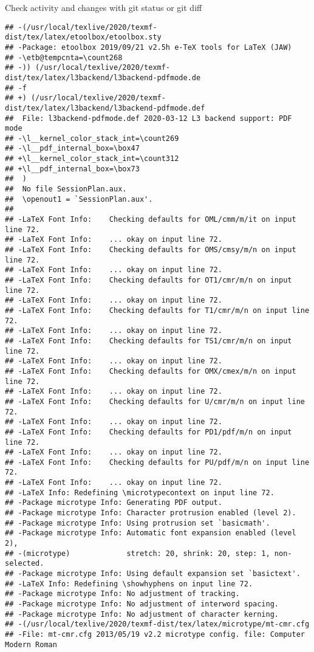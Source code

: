 \documentclass[ignorenonframetext,]{beamer}
\begin{document}
\begin{frame}[fragile]{Check activity and changes with git status or git
diff}
\begin{verbatim}
## -(/usr/local/texlive/2020/texmf-dist/tex/latex/etoolbox/etoolbox.sty
## -Package: etoolbox 2019/09/21 v2.5h e-TeX tools for LaTeX (JAW)
## -\etb@tempcnta=\count268
## -)) (/usr/local/texlive/2020/texmf-dist/tex/latex/l3backend/l3backend-pdfmode.de
## -f
## +) (/usr/local/texlive/2020/texmf-dist/tex/latex/l3backend/l3backend-pdfmode.def
##  File: l3backend-pdfmode.def 2020-03-12 L3 backend support: PDF mode
## -\l__kernel_color_stack_int=\count269
## -\l__pdf_internal_box=\box47
## +\l__kernel_color_stack_int=\count312
## +\l__pdf_internal_box=\box73
##  )
##  No file SessionPlan.aux.
##  \openout1 = `SessionPlan.aux'.
##  
## -LaTeX Font Info:    Checking defaults for OML/cmm/m/it on input line 72.
## -LaTeX Font Info:    ... okay on input line 72.
## -LaTeX Font Info:    Checking defaults for OMS/cmsy/m/n on input line 72.
## -LaTeX Font Info:    ... okay on input line 72.
## -LaTeX Font Info:    Checking defaults for OT1/cmr/m/n on input line 72.
## -LaTeX Font Info:    ... okay on input line 72.
## -LaTeX Font Info:    Checking defaults for T1/cmr/m/n on input line 72.
## -LaTeX Font Info:    ... okay on input line 72.
## -LaTeX Font Info:    Checking defaults for TS1/cmr/m/n on input line 72.
## -LaTeX Font Info:    ... okay on input line 72.
## -LaTeX Font Info:    Checking defaults for OMX/cmex/m/n on input line 72.
## -LaTeX Font Info:    ... okay on input line 72.
## -LaTeX Font Info:    Checking defaults for U/cmr/m/n on input line 72.
## -LaTeX Font Info:    ... okay on input line 72.
## -LaTeX Font Info:    Checking defaults for PD1/pdf/m/n on input line 72.
## -LaTeX Font Info:    ... okay on input line 72.
## -LaTeX Font Info:    Checking defaults for PU/pdf/m/n on input line 72.
## -LaTeX Font Info:    ... okay on input line 72.
## -LaTeX Info: Redefining \microtypecontext on input line 72.
## -Package microtype Info: Generating PDF output.
## -Package microtype Info: Character protrusion enabled (level 2).
## -Package microtype Info: Using protrusion set `basicmath'.
## -Package microtype Info: Automatic font expansion enabled (level 2),
## -(microtype)             stretch: 20, shrink: 20, step: 1, non-selected.
## -Package microtype Info: Using default expansion set `basictext'.
## -LaTeX Info: Redefining \showhyphens on input line 72.
## -Package microtype Info: No adjustment of tracking.
## -Package microtype Info: No adjustment of interword spacing.
## -Package microtype Info: No adjustment of character kerning.
## -(/usr/local/texlive/2020/texmf-dist/tex/latex/microtype/mt-cmr.cfg
## -File: mt-cmr.cfg 2013/05/19 v2.2 microtype config. file: Computer Modern Roman 

\end{verbatim}
\end{frame}
\end{document}
